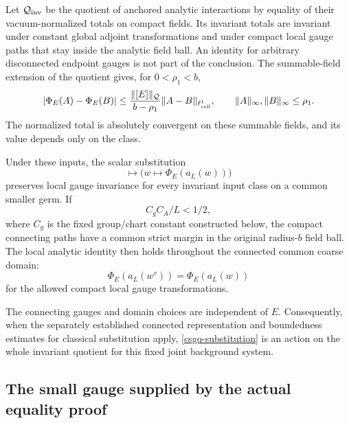 Let $\mathcal Q_{\rm inv}$ be the quotient of anchored analytic
interactions by equality of their vacuum-normalized totals on compact
fields. Its invariant totals are invariant under constant global
adjoint transformations and under compact local gauge paths that stay
inside the analytic field ball. An identity for arbitrary disconnected
endpoint gauges is not part of the conclusion. The summable-field
extension of the quotient gives, for $0<\rho_1<b$,
\begin{equation}
 |\Phi_E(A)-\Phi_E(B)|
 \le \frac{\|[E]\|_{\mathcal Q}}{b-\rho_1}
                 \|A-B\|_{\ell^1_{\rm cell}},
 \qquad \|A\|_\infty,\|B\|_\infty\le\rho_1.
 \label{csgq-summable-continuity}
\end{equation}
The normalized total is absolutely convergent on these summable fields,
and its value depends only on the class.

\begin{theorem}
\label{csgq-main}
Under these inputs, the scalar substitution
\begin{equation}
 [E]\longmapsto
       \bigl(w\longmapsto \Phi_E(a_L(w))\bigr)
 \label{csgq-substitution}
\end{equation}
preserves local gauge invariance for every invariant input class on a
common smaller germ. If
\begin{equation}
             C_g C_A/L<1/2,
 \label{csgq-margin-condition}
\end{equation}
where $C_g$ is the fixed group/chart constant constructed below, the
compact connecting paths have a common strict margin in the original
radius-$b$ field ball. The local analytic identity then holds throughout
the connected common coarse domain:
\begin{equation}
             \Phi_E(a_L(w^v))=\Phi_E(a_L(w))
 \label{csgq-gauge-identity}
\end{equation}
for the allowed compact local gauge transformations.

The connecting gauges and domain choices are independent of $E$.
Consequently, when the separately established connected representation
and boundedness estimates for classical substitution apply,
\eqref{csgq-substitution} is an action on the whole invariant quotient
for this fixed joint background system.
\end{theorem}

\subsection{The small gauge supplied by the actual equality proof}
\label{csgq-finite-section}

